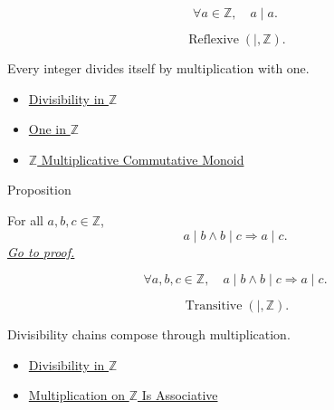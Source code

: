 \begin{remark*}
\[
\forall a\in\mathbb{Z},\quad a\mid a.
\]
\end{remark*}

\begin{remark*}
\[
\operatorname{Reflexive}(\mid,\mathbb{Z}).
\]
\end{remark*}

\begin{remark*}[Interpretation]
Every integer divides itself by multiplication with one.
\end{remark*}

\begin{dependencies}
\begin{itemize}
  \item \hyperref[def:divisibility-in-z]{Divisibility in $\mathbb{Z}$}
  \item \hyperref[def:one-in-z]{One in $\mathbb{Z}$}
  \item \hyperref[thm:z-multiplicative-commutative-monoid]{$\mathbb{Z}$ Multiplicative Commutative Monoid}
\end{itemize}
\end{dependencies}

\begin{propositionbox}{Proposition}
\begin{proposition}
\label{prop:divisibility-transitive-on-z}
For all $a,b,c\in\mathbb{Z}$,
\[
a\mid b\land b\mid c \Longrightarrow a\mid c.
\]
\hyperref[prf:divisibility-transitive-on-z]{\textit{Go to proof.}}
\end{proposition}
\end{propositionbox}

\begin{remark*}
\[
\forall a,b,c\in\mathbb{Z},\quad
a\mid b\land b\mid c \Longrightarrow a\mid c.
\]
\end{remark*}

\begin{remark*}
\[
\operatorname{Transitive}(\mid,\mathbb{Z}).
\]
\end{remark*}

\begin{remark*}[Interpretation]
Divisibility chains compose through multiplication.
\end{remark*}

\begin{dependencies}
\begin{itemize}
  \item \hyperref[def:divisibility-in-z]{Divisibility in $\mathbb{Z}$}
  \item \hyperref[thm:multiplication-on-z-associative]{Multiplication on $\mathbb{Z}$ Is Associative}
\end{itemize}
\end{dependencies}

